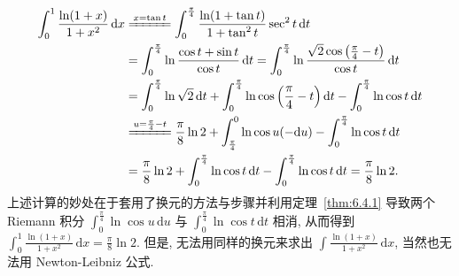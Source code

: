 \begin{solution}[解法 1]
\begin{align*}
\int_{0}^{1}\frac{\ln(1+x)}{1+x^{2}}\,\mathrm{d}x&\xlongequal{x=\tan t}\int_{0}^{\frac{\pi}{4}}\frac{\ln(1+\tan t)}{1+\tan^{2}t}\sec^{2}t\,\mathrm{d}t\\
&=\int_{0}^{\frac{\pi}{4}}\ln\frac{\cos t+\sin t}{\cos t}\,\mathrm{d}t=\int_{0}^{\frac{\pi}{4}}\ln\frac{\sqrt{2}\cos\left(\frac{\pi}{4}-t\right)}{\cos t}\,\mathrm{d}t\\
&=\int_{0}^{\frac{\pi}{4}}\ln\sqrt{2}\,\mathrm{d}t+\int_{0}^{\frac{\pi}{4}}\ln\cos\left(\frac{\pi}{4}-t\right)\mathrm{d}t-\int_{0}^{\frac{\pi}{4}}\ln\cos t\,\mathrm{d}t\\
&\xlongequal{u=\frac{\pi}{4}-t}\frac{\pi}{8}\ln2+\int_{\frac{\pi}{4}}^{0}\ln\cos u(-\mathrm{d}u)-\int_{0}^{\frac{\pi}{4}}\ln\cos t\,\mathrm{d}t\\
&=\frac{\pi}{8}\ln2+\int_{0}^{\frac{\pi}{4}}\ln\cos t\,\mathrm{d}t-\int_{0}^{\frac{\pi}{4}}\ln\cos t\,\mathrm{d}t=\frac{\pi}{8}\ln2.
\end{align*}
上述计算的妙处在于套用了换元的方法与步骤并利用定理~\ref{thm:6.4.1} 导致两个 Riemann 积分 $\int_{0}^{\frac{\pi}{4}}\ln\cos u\,\mathrm{d}u$ 与 $\int_{0}^{\frac{\pi}{4}}\ln\cos t\,\mathrm{d}t$ 相消, 从而得到 $\int_{0}^{1}\frac{\ln(1+x)}{1+x^{2}}\,\mathrm{d}x=\frac{\pi}{8}\ln2$. 但是, 无法用同样的换元来求出 $\int\frac{\ln(1+x)}{1+x^{2}}\,\mathrm{d}x$, 当然也无法用 Newton-Leibniz 公式.
\end{solution}

